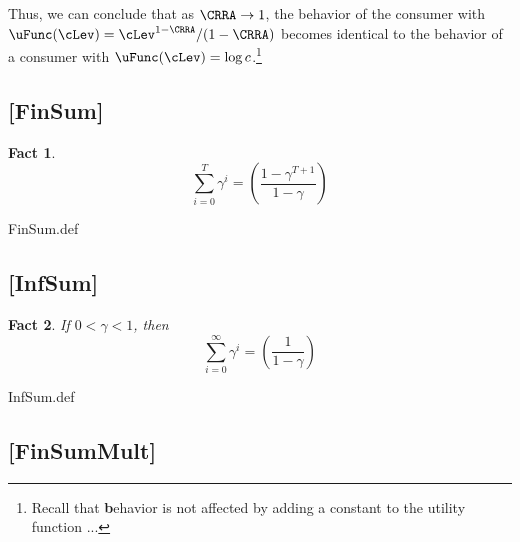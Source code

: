 \documentclass{handout}
\newtheorem{Fact}{Fact}
\begin{document}
Thus, we can conclude that as $\CRRA \rightarrow 1$, the behavior of
the consumer with $\uFunc(\cLev)=\cLev^{1-\CRRA}/(1-\CRRA)$ becomes identical to
the behavior of a consumer with $\uFunc(\cLev)=\log c$.\footnote{Recall that \textbf{b}ehavior is not affected by adding a constant to the utility function ...}


\hypertarget{FinSum}{}
\subsection{[FinSum]}\label{fact:FinSum} 


\begin{Fact} 
\begin{equation}
\displaystyle \sum_{i=0}^{T} \gamma^{i} = \left(\frac{1-\gamma^{T+1}}{1-\gamma}\right)
\end{equation} 
\end{Fact}

\begin{verbatimwrite}{FinSum.def}
\providecommand{\FinSum}{\href{https://www.econ2.jhu.edu/people/ccarroll/public/LectureNotes/MathFacts/MathFactsList\#FinSum}{\ensuremath{\mathtt{[FinSum]}}}}
\end{verbatimwrite}


\hypertarget{InfSum}{}

\subsection{[InfSum]}\label{fact:InfSum}


\begin{Fact} If $0 < \gamma < 1$, then 
\begin{equation}
\displaystyle \sum_{i=0}^{\infty} \gamma^{i} = \left(\frac{1}{1-\gamma}\right)
\end{equation}
\end{Fact}

\begin{verbatimwrite}{InfSum.def}
\providecommand{\InfSum}{\href{https://www.econ2.jhu.edu/people/ccarroll/public/LectureNotes/MathFacts/MathFactsList\#InfSum}{\ensuremath{\mathtt{[InfSum]}}}}
\end{verbatimwrite}

\hypertarget{FinSumMult}{}
\subsection{[FinSumMult]}\label{fact:FinSumMult} 
\end{document}
